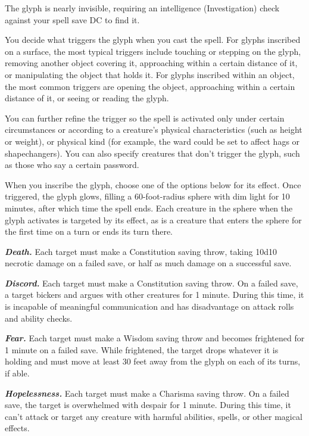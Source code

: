 \documentclass[
]{article}
\begin{document}
The glyph is nearly invisible, requiring an intelligence (Investigation)
check against your spell save DC to find it.

You decide what triggers the glyph when you cast the spell. For glyphs
inscribed on a surface, the most typical triggers include touching or
stepping on the glyph, removing another object covering it, approaching
within a certain distance of it, or manipulating the object that holds
it. For glyphs inscribed within an object, the most common triggers are
opening the object, approaching within a certain distance of it, or
seeing or reading the glyph.

You can further refine the trigger so the spell is activated only under
certain circumstances or according to a creature's physical
characteristics (such as height or weight), or physical kind (for
example, the ward could be set to affect hags or shapechangers). You can
also specify creatures that don't trigger the glyph, such as those who
say a certain password.

When you inscribe the glyph, choose one of the options below for its
effect. Once triggered, the glyph glows, filling a 60-foot-radius sphere
with dim light for 10 minutes, after which time the spell ends. Each
creature in the sphere when the glyph activates is targeted by its
effect, as is a creature that enters the sphere for the first time on a
turn or ends its turn there.

\emph{\textbf{Death.}} Each target must make a Constitution saving
throw, taking 10d10 necrotic damage on a failed save, or half as much
damage on a successful save.

\emph{\textbf{Discord.}} Each target must make a Constitution saving
throw. On a failed save, a target bickers and argues with other
creatures for 1 minute. During this time, it is incapable of meaningful
communication and has disadvantage on attack rolls and ability checks.

\emph{\textbf{Fear.}} Each target must make a Wisdom saving throw and
becomes frightened for 1 minute on a failed save. While frightened, the
target drops whatever it is holding and must move at least 30 feet away
from the glyph on each of its turns, if able.

\emph{\textbf{Hopelessness.}} Each target must make a Charisma saving
throw. On a failed save, the target is overwhelmed with despair for 1
minute. During this time, it can't attack or target any creature with
harmful abilities, spells, or other magical effects.
\end{document}
